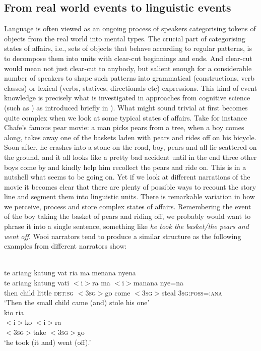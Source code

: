 \subsection{From real world events to linguistic events}\label{sec:real-world-linguistic-events}

Language is often viewed as an ongoing process of speakers categorising tokens of objects from the real world into mental types. The crucial part of categorising states of affairs, i.e., sets of objects that behave according to regular patterns, is to decompose them into units with clear-cut beginnings and ends. And clear-cut would mean not just clear-cut to anybody, but salient enough for a considerable number of speakers to shape such patterns into grammatical (constructions, verb classes) or lexical (verbs, statives, directionals etc) expressions. This kind of event knowledge \citep{Elman2009} is precisely what is investigated in approaches from cognitive science (such as \citealt{newtson1976perceptual, zacks2007event, zacks2010we}) as introduced briefly in ). What might sound trivial at first becomes quite complex when we look at some typical states of affairs. Take for instance Chafe's famous pear movie: a man picks pears from a tree, when a boy comes along, takes away one of the baskets laden with pears and rides off on his bicycle. Soon after, he crashes into a stone on the road, boy, pears and all lie scattered on the ground, and it all looks like a pretty bad accident until in the end three other boys come by and kindly help him recollect the pears and ride on. This is in a nutshell what seems to be going on. Yet if we look at different narrations of the movie it becomes clear that there are plenty of possible ways to recount the story line and segment them into linguistic units. There is remarkable variation in how we perceive, process and store complex states of affairs. Remembering the event of the boy taking the basket of pears and riding off, we probably would want to phrase it into a single sentence, something like \textit{he took the basket/the pears and went off}. Wooi narrators tend to produce a similar structure as the following examples from different narrators show:

\ea
{}\\
\ea
\glll te ariang katung vat ria ma menana nyena \\
te ariang katung vati $<$i$>$ra ma $<$i$>$manana nye=na \\
then child little \textsc{det}:\textsc{sg} $<$\textsc{3}\textsc{sg}$>$go come $<$\textsc{3}\textsc{sg}$>$steal \textsc{3}\textsc{sg}:\textsc{poss}=:\textsc{ana}\\
\glft `Then the small child came (and) stole his one'\\
\ex
\glll kio ria\\
$<$i$>$ko $<$i$>$ra \\
$<$\textsc{3}\textsc{sg}$>$take $<$\textsc{3}\textsc{sg}$>$go\\
\glft `he took (it and) went (off).'\\ 
\z
\z


